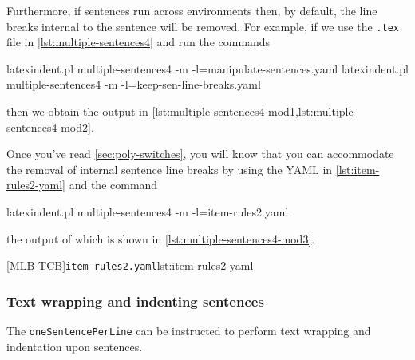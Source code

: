  Furthermore, if sentences run across environments then, by default, the line breaks
 internal to the sentence will be removed. For example, if we use the \texttt{.tex} file
 in \cref{lst:multiple-sentences4} and run the commands 
 \begin{commandshell}
latexindent.pl multiple-sentences4 -m -l=manipulate-sentences.yaml
latexindent.pl multiple-sentences4 -m -l=keep-sen-line-breaks.yaml
\end{commandshell}
 then we obtain the output in
 \cref{lst:multiple-sentences4-mod1,lst:multiple-sentences4-mod2}.
 \begin{widepage}
 \end{widepage}

 Once you've read \cref{sec:poly-switches}, you will know that you can accommodate the
 removal of internal sentence line breaks by using the YAML in \cref{lst:item-rules2-yaml}
 and the command  
 \begin{commandshell}
latexindent.pl multiple-sentences4 -m -l=item-rules2.yaml
\end{commandshell}
 the output of which is shown in \cref{lst:multiple-sentences4-mod3}.

 \begin{cmhtcbraster}
  [MLB-TCB]{\texttt{item-rules2.yaml}}{lst:item-rules2-yaml}
 \end{cmhtcbraster}

\subsubsection{Text wrapping and indenting sentences}
 The \texttt{oneSentencePerLine}  can be instructed to perform text wrapping and indentation upon sentences.

